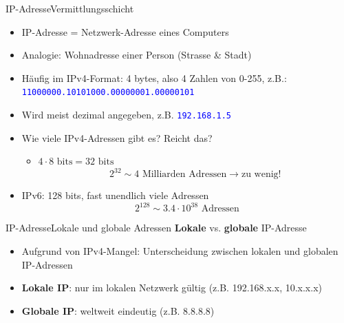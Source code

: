 \begin{frame}[fragile]{\faMapMarker{} \gls{IP}-Adresse}{Vermittlungsschicht}

    \begin{itemize}[<+->]
        \item \gls{IP}-Adresse = Netzwerk-Adresse eines Computers
        \item Analogie: Wohnadresse einer Person (Strasse \& Stadt)
        \item Häufig im \gls{IP}v4-Format: 4 bytes, also 4 Zahlen von 0-255, z.B.:\\
              \textcolor{blue}{\texttt{11000000.10101000.00000001.00000101}}
        \item Wird meist dezimal angegeben, z.B. \textcolor{blue}{\texttt{192.168.1.5}}

        \item Wie viele \gls{IP}v4-Adressen gibt es? Reicht das?
              \begin{itemize}
                  \item $4\cdot 8 \text{ bits} = 32 \text{ bits}$
                        \[2^{32} \sim 4 \text{ Milliarden Adressen} \rightarrow \text{zu wenig!}\]
              \end{itemize}
        \item \gls{IP}v6: 128 bits, fast unendlich viele Adressen
              \[2^{128} \sim 3.4\cdot 10^{38}  \text{ Adressen}\]
    \end{itemize}
\end{frame}

\begin{frame}{\faMapMarker{} \gls{IP}-Adresse}{Lokale und globale Adressen}
    \textbf{Lokale} vs. \textbf{globale} \gls{IP}-Adresse
    \begin{itemize}
        \item Aufgrund von \gls{IP}v4-Mangel: Unterscheidung zwischen lokalen und globalen \gls{IP}-Adressen
        \item \textbf{Lokale \gls{IP}}: nur im lokalen Netzwerk gültig (z.B. 192.168.x.x, 10.x.x.x)
        \item \textbf{Globale \gls{IP}}: weltweit eindeutig (z.B. 8.8.8.8)
    \end{itemize}
\end{frame}

